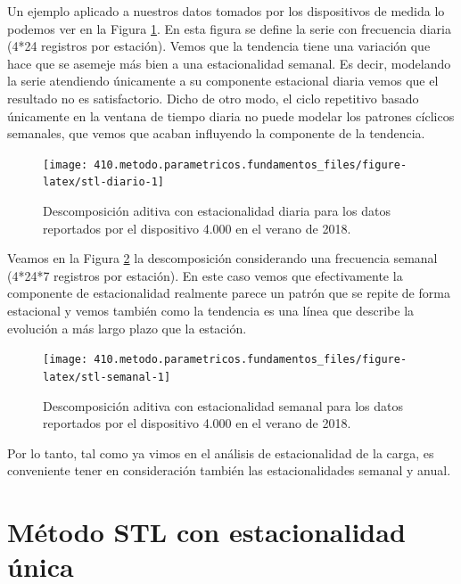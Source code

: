 \documentclass[]{book}
\begin{document}
Un ejemplo aplicado a nuestros datos tomados por los dispositivos de
medida lo podemos ver en la Figura \ref{fig:stl-diario}. En esta figura
se define la serie con frecuencia diaria (4*24 registros por estación).
Vemos que la tendencia tiene una variación que hace que se asemeje más
bien a una estacionalidad semanal. Es decir, modelando la serie
atendiendo únicamente a su componente estacional diaria vemos que el
resultado no es satisfactorio. Dicho de otro modo, el ciclo repetitivo
basado únicamente en la ventana de tiempo diaria no puede modelar los
patrones cíclicos semanales, que vemos que acaban influyendo la
componente de la tendencia.

\begin{figure}

{\centering \texttt{[image: 410.metodo.parametricos.fundamentos\_files/figure-latex/stl-diario-1]} 

}

\caption{Descomposición aditiva con estacionalidad diaria para los datos reportados por el dispositivo 4.000 en el verano de 2018.}\label{fig:stl-diario}
\end{figure}

Veamos en la Figura \ref{fig:stl-semanal} la descomposición considerando
una frecuencia semanal (4*24*7 registros por estación). En este caso
vemos que efectivamente la componente de estacionalidad realmente parece
un patrón que se repite de forma estacional y vemos también como la
tendencia es una línea que describe la evolución a más largo plazo que
la estación.

\begin{figure}

{\centering \texttt{[image: 410.metodo.parametricos.fundamentos\_files/figure-latex/stl-semanal-1]} 

}

\caption{Descomposición aditiva con estacionalidad semanal para los datos reportados por el dispositivo 4.000 en el verano de 2018.}\label{fig:stl-semanal}
\end{figure}

Por lo tanto, tal como ya vimos en el análisis de estacionalidad de la
carga, es conveniente tener en consideración también las
estacionalidades semanal y anual.

\section{Método STL con estacionalidad
única}\label{metodo-stl-con-estacionalidad-unica}
\end{document}
